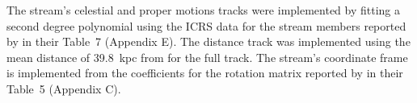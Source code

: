 The stream's celestial and proper motions tracks were implemented by fitting a second degree polynomial using the ICRS data for the stream members reported by \citet{Shipp2019} in their Table~7 (Appendix E). The distance track was implemented using the mean distance of 39.8~kpc from \citet{Shipp2018} for the full track. The stream's coordinate frame is implemented from the coefficients for the rotation matrix reported by \citet{Shipp2019} in their Table~5 (Appendix C).

